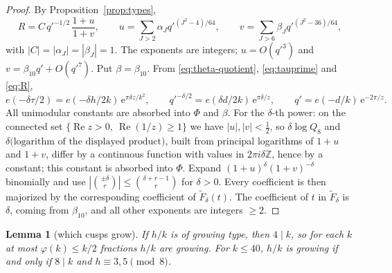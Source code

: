 \documentclass[11pt]{amsart}
\newtheorem{lemma}[theorem]{Lemma}
\theoremstyle{remark}
\theoremstyle{definition}
\newcommand{\Z}{\mathbb Z}
\newcommand{\Rea}{\operatorname{Re}}
\newcommand{\e}{\mathrm e}
\begin{document}
\begin{proof}
By Proposition~\ref{prop:types},
\[
R=C\,q'^{-1/2}\,\frac{1+u}{1+v},\qquad u=\sum_{J>2}\alpha_Jq'^{(J^2-4)/64},\qquad v=\sum_{J>6}\beta_Jq'^{(J^2-36)/64},
\]
with $|C|=|\alpha_J|=|\beta_J|=1$. The exponents are integers; $u=O(q'^3)$ and $v=\beta_{10}q'+O(q'^7)$. Put $\beta=\beta_{10}$. From \eqref{eq:theta-quotient}, \eqref{eq:tauprime} and \eqref{eq:R},
\[
e(-\delta\tau/2)=e(-\delta h/2k)\,\e^{\pi\delta z/k^2},\qquad q'^{-\delta/2}=e(\delta d/2k)\,\e^{\pi\delta/z},\qquad q'=e(-d/k)\,\e^{-2\pi/z}.
\]
All unimodular constants are absorbed into $\Phi$ and $\beta$. For the $\delta$-th power: on the connected set $\{\Rea z>0,\ \Rea(1/z)\ge1\}$ we have $|u|,|v|<\frac12$, so $\delta\log Q_8$ and $\delta\big(\text{logarithm of the displayed product}\big)$, built from principal logarithms of $1+u$ and $1+v$, differ by a continuous function with values in $2\pi i\delta\Z$, hence by a constant; this constant is absorbed into $\Phi$. Expand $(1+u)^\delta(1+v)^{-\delta}$ binomially and use $|\binom{\pm\delta}{r}|\le\binom{\delta+r-1}{r}$ for $\delta>0$. Every coefficient is then majorized by the corresponding coefficient of $\widetilde F_\delta(t)$. The coefficient of $t$ in $\widetilde F_\delta$ is $\delta$, coming from $\beta_{10}$, and all other exponents are integers $\ge2$.
\end{proof}

\begin{lemma}[which cusps grow]\label{lem:which}
If $h/k$ is of growing type, then $4\mid k$, so for each $k$ at most $\varphi(k)\le k/2$ fractions $h/k$ are growing. For $k\le40$, $h/k$ is growing if and only if $8\mid k$ and $h\equiv3,5\pmod8$.
\end{lemma}
\end{document}
